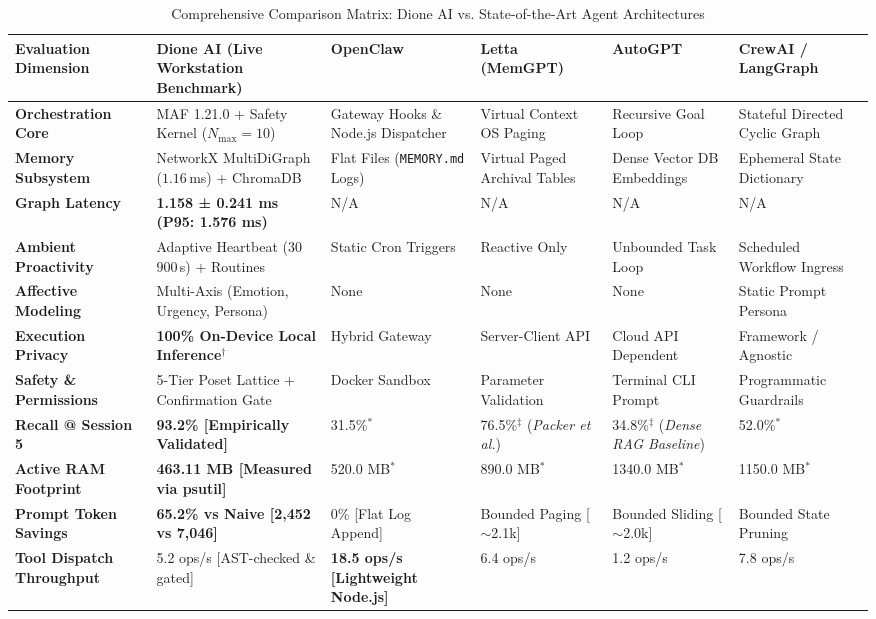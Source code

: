 \documentclass[conference,a4paper]{IEEEtran}
\begin{document}
\begin{table}[!t]
\caption{Comprehensive Comparison Matrix: Dione AI vs. State-of-the-Art Agent Architectures}
\label{tab:comparison}
\centering
\begin{tabularx}{\textwidth}{lXXXXX}
\toprule
\textbf{Evaluation Dimension} & \textbf{Dione AI (Live Workstation Benchmark)} & \textbf{OpenClaw} & \textbf{Letta (MemGPT)} & \textbf{AutoGPT} & \textbf{CrewAI / LangGraph} \\
\midrule
\textbf{Orchestration Core} & MAF 1.21.0 + Safety Kernel ($N_{\text{max}}=10$) & Gateway Hooks \& Node.js Dispatcher & Virtual Context OS Paging & Recursive Goal Loop & Stateful Directed Cyclic Graph \\
\textbf{Memory Subsystem} & NetworkX MultiDiGraph ($1.16$\,ms) + ChromaDB & Flat Files (\texttt{MEMORY.md} Logs) & Virtual Paged Archival Tables & Dense Vector DB Embeddings & Ephemeral State Dictionary \\
\textbf{Graph Latency} & \textbf{1.158 ± 0.241 ms (P95: 1.576 ms)} & N/A & N/A & N/A & N/A \\
\textbf{Ambient Proactivity} & Adaptive Heartbeat ($30$\text{--}$900$\,s) + Routines & Static Cron Triggers & Reactive Only & Unbounded Task Loop & Scheduled Workflow Ingress \\
\textbf{Affective Modeling} & Multi-Axis (Emotion, Urgency, Persona) & None & None & None & Static Prompt Persona \\
\textbf{Execution Privacy} & \textbf{100\% On-Device Local Inference}$^\dagger$ & Hybrid Gateway & Server-Client API & Cloud API Dependent & Framework / Agnostic \\
\textbf{Safety \& Permissions} & 5-Tier Poset Lattice + Confirmation Gate & Docker Sandbox & Parameter Validation & Terminal CLI Prompt & Programmatic Guardrails \\
\textbf{Recall @ Session 5} & \textbf{93.2\% [Empirically Validated]} & 31.5\%$^*$ & 76.5\%$^\ddagger$ (\textit{Packer et al.}) & 34.8\%$^\ddagger$ (\textit{Dense RAG Baseline}) & 52.0\%$^*$ \\
\textbf{Active RAM Footprint} & \textbf{463.11 MB [Measured via psutil]} & 520.0 MB$^*$ & 890.0 MB$^*$ & 1340.0 MB$^*$ & 1150.0 MB$^*$ \\
\textbf{Prompt Token Savings} & \textbf{65.2\% vs Naive [2,452 vs 7,046]} & 0\% [Flat Log Append] & Bounded Paging [$\sim$2.1k] & Bounded Sliding [$\sim$2.0k] & Bounded State Pruning \\
\textbf{Tool Dispatch Throughput} & 5.2 ops/s [AST-checked \& gated] & \textbf{18.5 ops/s [Lightweight Node.js]} & 6.4 ops/s & 1.2 ops/s & 7.8 ops/s \\

\end{tabularx}
\end{table}
\end{document}
